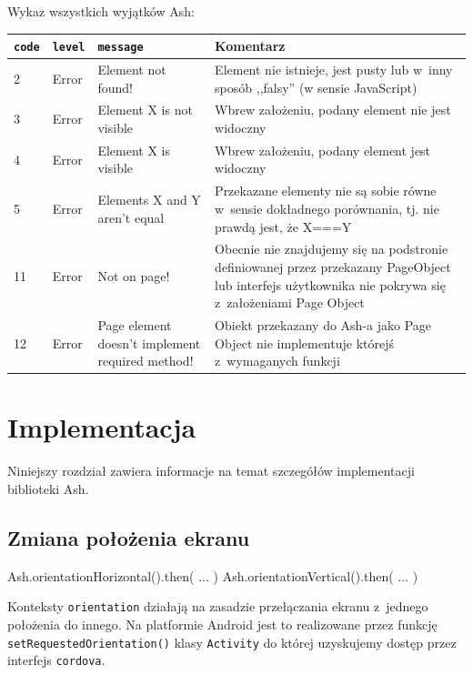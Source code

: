 \documentclass[brudnopis]{xmgr}
\begin{document}
Wykaz wszystkich wyjątków Ash:
\begin{center}
    \begin{tabularx}{\textwidth}{ | p{1cm} | p{2cm} | X | X |}
    \hline
    \texttt{code} & \texttt{level} & \texttt{message} & Komentarz \\ \hline
    2 & Error & Element not found! & Element nie istnieje, jest pusty lub w~inny sposób ,,falsy'' (w sensie JavaScript)  \\ \hline
    3 & Error & Element X is not visible & Wbrew założeniu, podany element nie jest widoczny  \\ \hline
    4 & Error & Element X is visible & Wbrew założeniu, podany element jest widoczny  \\ \hline
    5 & Error & Elements X and Y aren't equal & Przekazane elementy nie są sobie równe w~sensie dokładnego porównania, tj.  nie prawdą jest, że X===Y  \\ \hline
    11 & Error & Not on page! & Obecnie nie znajdujemy się na podstronie definiowanej przez przekazany PageObject lub interfejs użytkownika nie pokrywa się z~założeniami Page Object  \\ \hline
    12 & Error & Page element doesn't implement required method! & Obiekt przekazany do Ash-a jako Page Object nie implementuje którejś z~wymaganych funkcji  \\ \hline
    \end{tabularx}
\end{center}

\chapter{Implementacja}

Niniejszy rozdział zawiera informacje na temat szczegółów implementacji biblioteki Ash.

\section{Zmiana położenia ekranu}

\begin{javascriptcode}
  Ash.orientationHorizontal().then( ... )   
  Ash.orientationVertical().then( ... ) 
\end{javascriptcode}

Konteksty \texttt{orientation} działają na zasadzie przełączania ekranu z~jednego położenia do innego. Na platformie Android jest to realizowane przez funkcję \texttt{setRequestedOrientation()} klasy \texttt{Activity} do której uzyskujemy dostęp przez interfejs \texttt{cordova}. 
\end{document}

